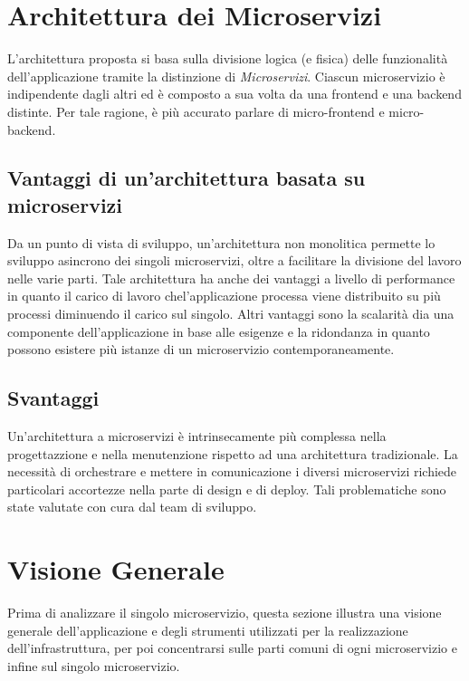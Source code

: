 \documentclass{report}
\begin{document}
\section{Architettura dei Microservizi}

L'architettura proposta si basa sulla divisione logica (e fisica) delle funzionalità dell'applicazione tramite la distinzione di \textit{Microservizi}. Ciascun microservizio è indipendente dagli altri ed è composto a sua volta da una frontend e una backend distinte. Per tale ragione, è più accurato parlare di micro-frontend e micro-backend.

\subsection*{Vantaggi di un'architettura basata su microservizi}

Da un punto di vista di sviluppo, un'architettura non monolitica permette lo sviluppo asincrono dei singoli microservizi, oltre a facilitare la divisione del lavoro nelle varie parti. Tale architettura ha anche dei vantaggi a livello di performance in quanto il carico di lavoro chel'applicazione processa viene distribuito su più processi diminuendo il carico sul singolo. Altri vantaggi sono la scalarità dia una componente dell'applicazione in base alle esigenze e la ridondanza in quanto possono esistere più istanze di un microservizio contemporaneamente.

\subsection*{Svantaggi}

Un'architettura a microservizi è intrinsecamente più complessa nella progettazzione e nella menutenzione rispetto ad una architettura tradizionale. La necessità di orchestrare e mettere in comunicazione i diversi microservizi richiede particolari accortezze nella parte di design e di deploy. Tali problematiche sono state valutate con cura dal team di sviluppo.



\section{Visione Generale}
Prima di analizzare il singolo microservizio, questa sezione illustra una visione generale dell'applicazione e degli strumenti utilizzati per la realizzazione dell'infrastruttura, per poi concentrarsi sulle parti comuni di ogni microservizio e infine sul singolo microservizio.
\end{document}
